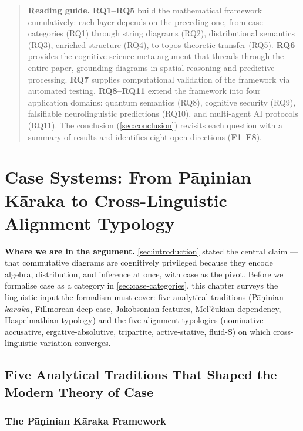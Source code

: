 \documentclass[
]{article}
\begin{document}
\endgroup

\begin{quote}
\textbf{Reading guide.} \textbf{RQ1--RQ5} build the mathematical
framework cumulatively: each layer depends on the preceding one, from
case categories (RQ1) through string diagrams (RQ2), distributional
semantics (RQ3), enriched structure (RQ4), to topos-theoretic transfer
(RQ5). \textbf{RQ6} provides the cognitive science meta-argument that
threads through the entire paper, grounding diagrams in spatial
reasoning and predictive processing. \textbf{RQ7} supplies computational
validation of the framework via automated testing. \textbf{RQ8--RQ11}
extend the framework into four application domains: quantum semantics
(RQ8), cognitive security (RQ9), falsifiable neurolinguistic predictions
(RQ10), and multi-agent AI protocols (RQ11). The conclusion
(\autoref{sec:conclusion}) revisits each question with a summary of
results and identifies eight open directions (\textbf{F1}--\textbf{F8}).
\end{quote}

\newpage

\section{Case Systems: From Pāṇinian Kāraka to Cross-Linguistic
Alignment Typology}\label{sec:case-systems}

\textbf{Where we are in the argument.} \autoref{sec:introduction} stated
the central claim --- that commutative diagrams are cognitively
privileged because they encode algebra, distribution, and inference at
once, with case as the pivot. Before we formalise case as a category in
\autoref{sec:case-categories}, this chapter surveys the linguistic input
the formalism must cover: five analytical traditions (Pāṇinian
\(k\bar{a}raka\), Fillmorean deep case, Jakobsonian features, Mel'čukian
dependency, Haspelmathian typology) and the five alignment typologies
(nominative-accusative, ergative-absolutive, tripartite, active-stative,
fluid-S) on which cross-linguistic variation converges.

\subsection{Five Analytical Traditions That Shaped the Modern Theory of
Case}\label{five-analytical-traditions-that-shaped-the-modern-theory-of-case}

\subsubsection{The Pāṇinian Kāraka
Framework}\label{the-pux101ux1e47inian-kux101raka-framework}
\end{document}
